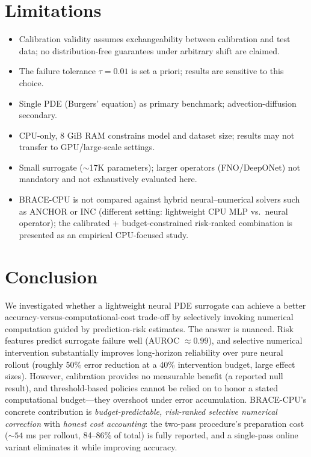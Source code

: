 \documentclass[11pt]{article}
\begin{document}
\section{Limitations}
\label{sec:limitations}
\begin{itemize}
\item Calibration validity assumes exchangeability between calibration and test data; no distribution-free guarantees under arbitrary shift are claimed.
\item The failure tolerance $\tau=0.01$ is set a priori; results are sensitive to this choice.
\item Single PDE (Burgers' equation) as primary benchmark; advection-diffusion secondary.
\item CPU-only, 8 GiB RAM constrains model and dataset size; results may not transfer to GPU/large-scale settings.
\item Small surrogate ($\sim$17K parameters); larger operators (FNO/DeepONet) not mandatory and not exhaustively evaluated here.
\item BRACE-CPU is not compared against hybrid neural--numerical solvers such as ANCHOR \citep{roy2025anchor} or INC \citep{wei2025inc} (different setting: lightweight CPU MLP vs.\ neural operator); the calibrated + budget-constrained risk-ranked combination is presented as an empirical CPU-focused study.
\end{itemize}

\section{Conclusion}
\label{sec:conclusion}

We investigated whether a lightweight neural PDE surrogate can achieve a better
accuracy-versus-computational-cost trade-off by selectively invoking numerical
computation guided by prediction-risk estimates. The answer is nuanced. Risk
features predict surrogate failure well (AUROC $\approx 0.99$), and selective
numerical intervention substantially improves long-horizon reliability over pure
neural rollout (roughly 50\% error reduction at a 40\% intervention budget,
large effect sizes). However, calibration provides no measurable benefit (a
reported null result), and threshold-based policies cannot be relied on to honor
a stated computational budget---they overshoot under error accumulation.
BRACE-CPU's concrete contribution is \emph{budget-predictable, risk-ranked
selective numerical correction} with
\emph{honest cost accounting}: the two-pass procedure's preparation cost
($\sim 54$ ms per rollout, 84--86\% of total) is fully reported, and a
single-pass online variant eliminates it while improving accuracy.
\end{document}
